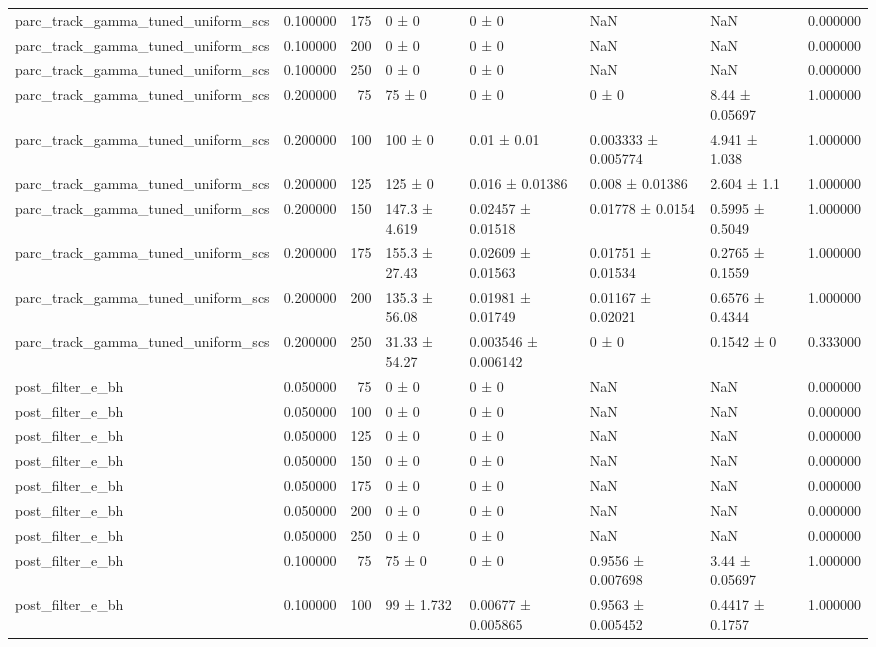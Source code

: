 \begin{tabular}{lrrllllr}
parc_track_gamma_tuned_uniform_scs & 0.100000 & 175 & 0 ± 0 & 0 ± 0 & NaN & NaN & 0.000000 \\
parc_track_gamma_tuned_uniform_scs & 0.100000 & 200 & 0 ± 0 & 0 ± 0 & NaN & NaN & 0.000000 \\
parc_track_gamma_tuned_uniform_scs & 0.100000 & 250 & 0 ± 0 & 0 ± 0 & NaN & NaN & 0.000000 \\
parc_track_gamma_tuned_uniform_scs & 0.200000 & 75 & 75 ± 0 & 0 ± 0 & 0 ± 0 & 8.44 ± 0.05697 & 1.000000 \\
parc_track_gamma_tuned_uniform_scs & 0.200000 & 100 & 100 ± 0 & 0.01 ± 0.01 & 0.003333 ± 0.005774 & 4.941 ± 1.038 & 1.000000 \\
parc_track_gamma_tuned_uniform_scs & 0.200000 & 125 & 125 ± 0 & 0.016 ± 0.01386 & 0.008 ± 0.01386 & 2.604 ± 1.1 & 1.000000 \\
parc_track_gamma_tuned_uniform_scs & 0.200000 & 150 & 147.3 ± 4.619 & 0.02457 ± 0.01518 & 0.01778 ± 0.0154 & 0.5995 ± 0.5049 & 1.000000 \\
parc_track_gamma_tuned_uniform_scs & 0.200000 & 175 & 155.3 ± 27.43 & 0.02609 ± 0.01563 & 0.01751 ± 0.01534 & 0.2765 ± 0.1559 & 1.000000 \\
parc_track_gamma_tuned_uniform_scs & 0.200000 & 200 & 135.3 ± 56.08 & 0.01981 ± 0.01749 & 0.01167 ± 0.02021 & 0.6576 ± 0.4344 & 1.000000 \\
parc_track_gamma_tuned_uniform_scs & 0.200000 & 250 & 31.33 ± 54.27 & 0.003546 ± 0.006142 & 0 ± 0 & 0.1542 ± 0 & 0.333000 \\
post_filter_e_bh & 0.050000 & 75 & 0 ± 0 & 0 ± 0 & NaN & NaN & 0.000000 \\
post_filter_e_bh & 0.050000 & 100 & 0 ± 0 & 0 ± 0 & NaN & NaN & 0.000000 \\
post_filter_e_bh & 0.050000 & 125 & 0 ± 0 & 0 ± 0 & NaN & NaN & 0.000000 \\
post_filter_e_bh & 0.050000 & 150 & 0 ± 0 & 0 ± 0 & NaN & NaN & 0.000000 \\
post_filter_e_bh & 0.050000 & 175 & 0 ± 0 & 0 ± 0 & NaN & NaN & 0.000000 \\
post_filter_e_bh & 0.050000 & 200 & 0 ± 0 & 0 ± 0 & NaN & NaN & 0.000000 \\
post_filter_e_bh & 0.050000 & 250 & 0 ± 0 & 0 ± 0 & NaN & NaN & 0.000000 \\
post_filter_e_bh & 0.100000 & 75 & 75 ± 0 & 0 ± 0 & 0.9556 ± 0.007698 & 3.44 ± 0.05697 & 1.000000 \\
post_filter_e_bh & 0.100000 & 100 & 99 ± 1.732 & 0.00677 ± 0.005865 & 0.9563 ± 0.005452 & 0.4417 ± 0.1757 & 1.000000 \\

\end{tabular}
